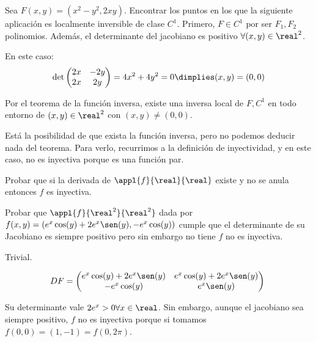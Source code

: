 \begin{problem}[0]
\label{ej3_0}
Sea $F(x,y) = (x^2-y^2,2xy)$. Encontrar los puntos en los que la siguiente aplicación es localmente inversible de clase $C^1$.
\solution
Primero,  $F \in C^1$ por ser $F_1,F_2$ polinomios. Además, el determinante del jacobiano es positivo $\forall (x,y)\in \real^2$. 
 
 En este caso: $$\det\begin{pmatrix}
                  2x&-2y\\
                  2x&2y
                 \end{pmatrix} = 4x^2 + 4y^2 = 0 \dimplies (x,y) = (0,0)$$           
                 
  Por el teorema de la función inversa, existe una inversa local de $F,C^1$ en todo entorno de $(x,y) \in \real^2$ con $(x,y)\neq (0,0)$. 
 
 Está la posibilidad de que exista la función inversa, pero no podemos deducir nada del teorema. Para verlo, recurrimos a la definición de inyectividad, y en este caso, no es inyectiva porque es una función par.

 \end{problem}

\begin{problem}[3]

\ppart Probar que si la derivada de $\appl{f}{\real}{\real}$ existe y no se anula entonces $f$ es inyectiva.

\ppart Probar que $\appl{f}{\real^2}{\real^2}$ dada por $f(x,y) =( e^x\cos(y) + 2e^x\sen(y),-e^x\cos(y))$ cumple que el determinante de su Jacobiano es siempre positivo pero sin embargo no tiene $f$ no es inyectiva.

\solution

\ppart Trivial.

\ppart  \[ DF = \begin{pmatrix}
       e^x\cos(y)+2e^x\sen(y) & e^x\cos(y)+2e^x\sen(y) \\
       -e^x\cos(y) & e^x\sen(y)
      \end{pmatrix} \]

Su determinante vale $2e^x > 0 \forall x \in \real$. Sin embargo, aunque el jacobiano sea siempre positivo, $f$ no es inyectiva porque si tomamos $f(0,0) = (1,-1) = f(0,2\pi)$.
\end{problem}


